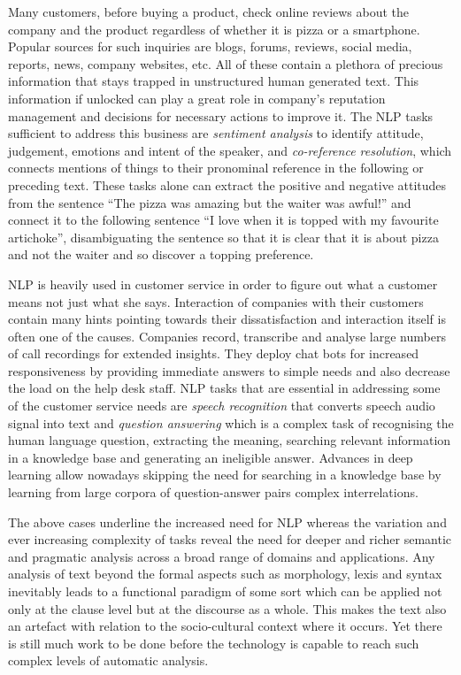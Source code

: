 Many customers, before buying a product, check online reviews about the company and the product regardless of whether it is pizza or a smartphone. Popular sources for such inquiries are blogs, forums, reviews, social media, reports, news, company websites, etc. All of these contain a plethora of precious information that stays trapped in unstructured human generated text. This information if unlocked can play a great role in company's reputation management and decisions for necessary actions to improve it. The NLP tasks sufficient to address this business are \textit{sentiment analysis} to identify attitude, judgement, emotions and intent of the speaker, and \textit{co-reference resolution}, which connects mentions of things to their pronominal reference in the following or preceding text. These tasks alone can extract the positive and negative attitudes from the sentence ``The pizza was amazing but the waiter was awful!'' and connect it to the following sentence ``I love when it is topped with my favourite artichoke'', disambiguating the sentence so that it is clear that it is about pizza and not the waiter and so discover a topping preference.

NLP is heavily used in customer service in order to figure out what a customer means not just what she says. Interaction of companies with their customers contain many hints pointing towards their dissatisfaction and interaction itself is often one of the causes. Companies record, transcribe and analyse large numbers of call recordings for extended insights. They deploy chat bots for increased responsiveness by providing immediate answers to simple needs and also decrease the load on the help desk staff. NLP tasks that are essential in addressing some of the customer service needs are \textit{speech recognition} that converts speech audio signal into text and \textit{question answering} which is a complex task of recognising the human language question, extracting the meaning, searching relevant information in a knowledge base and generating an ineligible answer. Advances in deep learning allow nowadays skipping the need for searching in a knowledge base by learning from large corpora of question-answer pairs complex interrelations. 

The above cases underline the increased need for NLP whereas the variation and ever increasing complexity of tasks reveal the need for deeper and richer semantic and pragmatic analysis across a broad range of domains and applications. Any analysis of text beyond the formal aspects such as morphology, lexis and syntax inevitably leads to a functional paradigm of some sort which can be applied not only at the clause level but at the discourse as a whole. This makes the text also an artefact with relation to the socio-cultural context where it occurs. Yet there is still much work to be done before the technology is capable to reach such complex levels of automatic analysis.

